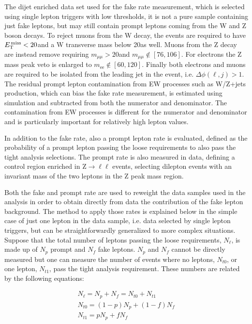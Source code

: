 The dijet enriched data set used for the fake rate measurement, which is selected using single lepton triggers with low \pt thresholds, it is not a pure sample containing just fake leptons, but may still contain prompt leptons coming from the W and Z boson decays. To reject muons from the W decay, the events are required to have $E_\mathrm{T}^\mathrm{\,miss}<20$\GeV and a W transverse mass below 20\GeV as well. Muons from the Z decay are instead remove requiring $m_{\mu\mu}>20$\GeV and $m_{\mu\mu} \notin [76,106]$\GeV. For electrons the Z mass peak veto is enlarged to $m_\mathrm{ee} \notin [60,120]$\GeV. Finally both electrons and muons are required to be isolated from the leading jet in the event, i.e. $\Delta\phi(\ell,j)>1$. The residual prompt lepton contamination from EW processes such as W/Z+jets production, which can bias the fake rate measurement, is estimated using simulation and subtracted from both the numerator and denominator. The contamination from EW processes is different for the numerator and denominator and is particularly important for relatively high lepton \pt values.

In addition to the fake rate, also a prompt lepton rate is evaluated, defined as the probability of a prompt lepton passing the loose requirements to also pass the tight analysis selections.
The prompt rate is also measured in data, defining a control region enriched in $\mathrm{Z} \to \ell\ell$ events, selecting dilepton events with an invariant mass of the two leptons in the Z peak mass region.

Both the fake and prompt rate are used to reweight the data samples used in the analysis in order to obtain directly from data the contribution of the fake lepton background. The method to apply those rates is explained below in the simple case of just one lepton in the data sample, i.e. data selected by single lepton triggers, but can be straightforwardly generalized to more complex situations.
Suppose that the total number of leptons passing the loose requirements, $N_\ell$, is made up of $N_p$ prompt and $N_f$ fake leptons. $N_p$ and $N_f$ cannot be directly measured but one can measure the number of events where no leptons, $N_{t0}$, or one lepton, $N_{t1}$, pass the tight analysis requirement. These numbers are related by the following equations:

\begin{equation}\label{eq:fake_single_lep}
\begin{gathered}
    N_\ell = N_p + N_f = N_{t0} + N_{t1}\\
    N_{t0} = (1-p)N_p + (1-f)N_f\\
    N_{t1} = pN_p + fN_f
\end{gathered}
\end{equation}

